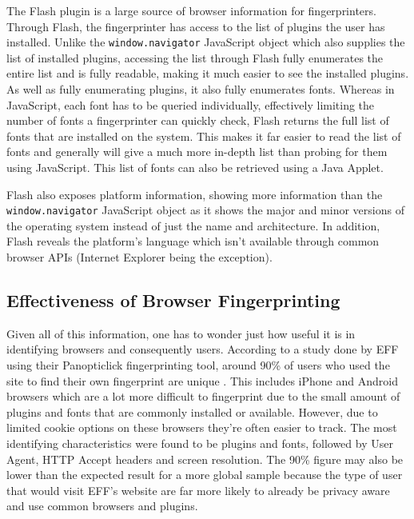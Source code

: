 The Flash plugin is a large source of browser information for fingerprinters.
Through Flash, the fingerprinter has access to the list of plugins the user has installed.
Unlike the \texttt{window.navigator} JavaScript object which also supplies the list of installed plugins, accessing the list through Flash fully enumerates the entire list and is fully readable, making it much easier to see the installed plugins.
As well as fully enumerating plugins, it also fully enumerates fonts.
Whereas in JavaScript, each font has to be queried individually, effectively limiting the number of fonts a fingerprinter can quickly check, Flash returns the full list of fonts that are installed on the system.
This makes it far easier to read the list of fonts and generally will give a much more in-depth list than probing for them using JavaScript.
This list of fonts can also be retrieved using a Java Applet.

Flash also exposes platform information, showing more information than the \texttt{window.navigator} JavaScript object as it shows the major and minor versions of the operating system instead of just the name and architecture.
In addition, Flash reveals the platform's language which isn't available through common browser APIs (Internet Explorer being the exception).

\subsection{Effectiveness of Browser Fingerprinting}

Given all of this information, one has to wonder just how useful it is in identifying browsers and consequently users.
According to a study done by EFF using their Panopticlick fingerprinting tool, around 90\% of users who used the site to find their own fingerprint are unique \citep{browser-uniqueness}.
This includes iPhone and Android browsers which are a lot more difficult to fingerprint due to the small amount of plugins and fonts that are commonly installed or available.
However, due to limited cookie options on these browsers they're often easier to track.
The most identifying characteristics were found to be plugins and fonts, followed by User Agent, HTTP Accept headers and screen resolution.
The 90\% figure may also be lower than the expected result for a more global sample because the type of user that would visit EFF's website are far more likely to already be privacy aware and use common browsers and plugins.

